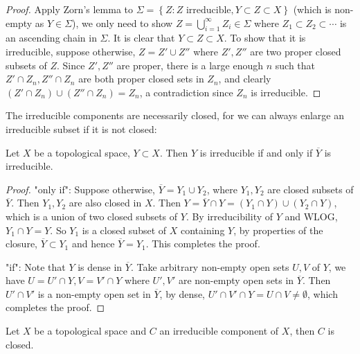 \documentclass{note-eng}
\begin{document}
\begin{proof}
    Apply Zorn's lemma to $\Sigma = \left\lbrace Z: Z \text{ irreducible}, Y \subset Z \subset X\right\rbrace$ (which is non-empty as $Y \in \Sigma$), we only need to show $Z = \bigcup\limits_{i = 1}^{\infty} Z_i \in \Sigma$ where $Z_1 \subset Z_2 \subset \cdots$ is an ascending chain in $\Sigma$. It is clear that $Y \subset Z \subset X$. To show that it is irreducible, suppose otherwise, $Z = Z' \cup Z''$ where $Z', Z''$ are two proper closed subsets of $Z$. Since $Z', Z''$ are proper, there is a large enough $n$ such that $Z' \cap Z_n, Z'' \cap Z_n$ are both proper closed sets in $Z_n$, and clearly $(Z' \cap Z_n) \cup (Z'' \cap Z_n) = Z_n$, a contradiction since $Z_n$ is irreducible.
\end{proof}

The irreducible components are necessarily closed, for we can always enlarge an irreducible subset if it is not closed:

\begin{proposition}\label{prop:irreducible-closure}
    Let $X$ be a topological space, $Y \subset X$. Then $Y$ is irreducible if and only if $\overline{Y}$ is irreducible.
\end{proposition}

\begin{proof}
    "only if": Suppose otherwise, $\overline{Y} = Y_1 \cup Y_2$, where $Y_1, Y_2$ are closed subsets of $\overline{Y}$. Then $Y_1, Y_2$ are also closed in $X$. Then $Y = \overline{Y} \cap Y = (Y_1 \cap Y) \cup (Y_2 \cap Y)$, which is a union of two closed subsets of $Y$. By irreducibility of $Y$ and WLOG, $Y_1 \cap Y = Y$. So $Y_1$ is a closed subset of $X$ containing $Y$, by properties of the closure, $\overline{Y} \subset Y_1$ and hence $\overline{Y} = Y_1$. This completes the proof.

    "if": Note that $Y$ is dense in $\overline{Y}$. Take arbitrary non-empty open sets $U, V$ of $Y$, we have $U = U' \cap Y, V = V' \cap Y$ where $U', V'$ are non-empty open sets in $\overline{Y}$. Then $U' \cap V'$ is a non-empty open set in $\overline{Y}$, by dense, $U' \cap V' \cap Y = U \cap V \ne \emptyset$, which completes the proof.
\end{proof}

\begin{corollary}
    Let $X$ be a topological space and $C$ an irreducible component of $X$, then $C$ is closed.
\end{corollary}
\end{document}
